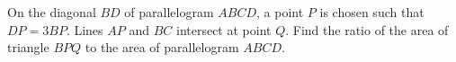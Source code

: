 On the diagonal $BD$ of parallelogram $ABCD$, a point $P$ is chosen such that $DP=3BP$. Lines $AP$ and $BC$ intersect at point $Q$. Find the ratio of the area of triangle $BPQ$ to the area of parallelogram $ABCD$.
